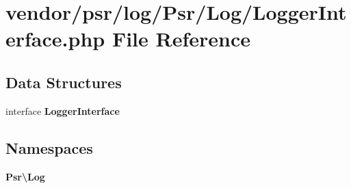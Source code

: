 \section{vendor/psr/log/\+Psr/\+Log/\+Logger\+Interface.php File Reference}
\label{psr_2log_2_psr_2_log_2_logger_interface_8php}
\subsection*{Data Structures}
\begin{DoxyCompactItemize}
\item 
interface {\bf Logger\+Interface}
\end{DoxyCompactItemize}
\subsection*{Namespaces}
\begin{DoxyCompactItemize}
\item 
 {\bf Psr\textbackslash{}\+Log}
\end{DoxyCompactItemize}
